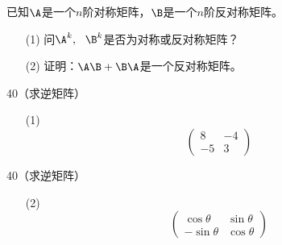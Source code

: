 \begin{frame}
  \begin{footnotesize}
    \begin{exampleblock}{39}
      已知$\A$是一个$n$阶对称矩阵，$\B$是一个$n$阶反对称矩阵。
      \begin{itemize}
      \item[(1)]问$\A^k,~~\B^k$是否为对称或反对称矩阵？
      \item[(2)]证明：$\A\B+\B\A$是一个反对称矩阵。
      \end{itemize}
    \end{exampleblock}
  \end{footnotesize}
\end{frame}



\begin{frame}
  \begin{footnotesize}
    \begin{exampleblock}{40（求逆矩阵）}
      \begin{itemize}
      \item[(1)]
        $$
        \left(
        \begin{array}{rr}
          8&-4\\
          -5&3
        \end{array}
        \right)
        $$
      \end{itemize}
    \end{exampleblock}
  \end{footnotesize}
\end{frame}

\begin{frame}
  \begin{footnotesize}
    \begin{exampleblock}{40（求逆矩阵）}
      \begin{itemize}
      \item[(2)]
        $$
        \left(
        \begin{array}{rr}
          \cos\theta&\sin\theta\\
          -\sin\theta&\cos\theta
        \end{array}
        \right)
        $$
      \end{itemize}
    \end{exampleblock}
  \end{footnotesize}
\end{frame}


